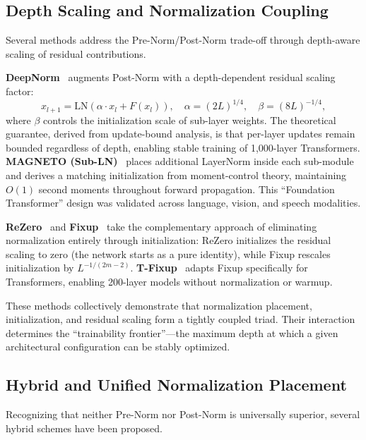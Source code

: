 \subsection{Depth Scaling and Normalization Coupling}
\label{subsec:depth_scaling_module}

Several methods address the Pre-Norm/Post-Norm trade-off through depth-aware scaling of residual contributions.

\textbf{DeepNorm}~\cite{wang2024deepnet} augments Post-Norm with a depth-dependent residual scaling factor:
\begin{equation}
  x_{l+1} = \mathrm{LN}(\alpha \cdot x_l + F(x_l)), \quad \alpha = (2L)^{1/4}, \quad \beta = (8L)^{-1/4},
  \label{eq:deepnorm_module}
\end{equation}
where $\beta$ controls the initialization scale of sub-layer weights. The theoretical guarantee, derived from update-bound analysis, is that per-layer updates remain bounded regardless of depth, enabling stable training of 1,000-layer Transformers. \textbf{MAGNETO (Sub-LN)}~\cite{wang2022magneto} places additional LayerNorm inside each sub-module and derives a matching initialization from moment-control theory, maintaining $O(1)$ second moments throughout forward propagation. This ``Foundation Transformer'' design was validated across language, vision, and speech modalities.

\textbf{ReZero}~\cite{bachlechner2021rezero} and \textbf{Fixup}~\cite{zhang2019fixup} take the complementary approach of eliminating normalization entirely through initialization: ReZero initializes the residual scaling to zero (the network starts as a pure identity), while Fixup rescales initialization by $L^{-1/(2m-2)}$. \textbf{T-Fixup}~\cite{huang2020tfixup} adapts Fixup specifically for Transformers, enabling 200-layer models without normalization or warmup.

These methods collectively demonstrate that normalization placement, initialization, and residual scaling form a tightly coupled triad. Their interaction determines the ``trainability frontier''---the maximum depth at which a given architectural configuration can be stably optimized.

\subsection{Hybrid and Unified Normalization Placement}
\label{subsec:hybrid_norm}

Recognizing that neither Pre-Norm nor Post-Norm is universally superior, several hybrid schemes have been proposed.

